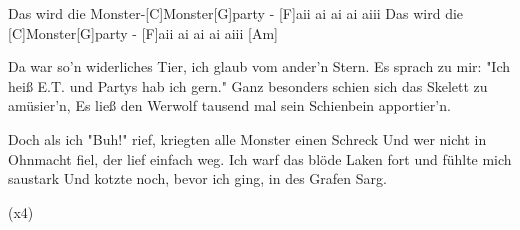 \begin{guitar}
	\begin{highlightbar}
		Das wird die Monster-[C]Monster[G]party - [F]aii ai ai ai aiii
		Das wird die [C]Monster[G]party - [F]aii ai ai ai aiii [Am]{}%
	\end{highlightbar}
	
	\songsection{Strophe 4}
	Da war so'n widerliches Tier, ich glaub vom ander'n Stern.
	Es sprach zu mir: "Ich heiß E.T. und Partys hab ich gern."
	Ganz besonders schien sich das Skelett zu amüsier'n,
	Es ließ den Werwolf tausend mal sein Schienbein apportier'n.
	
	Doch als ich "Buh!" rief, kriegten alle Monster einen Schreck
	Und wer nicht in Ohnmacht fiel, der lief einfach weg.
	Ich warf das blöde Laken fort und fühlte mich saustark
	Und kotzte noch, bevor ich ging, in des Grafen Sarg.
	
	\begin{highlightbar}
		  (x4)%
	\end{highlightbar}
\end{guitar}
